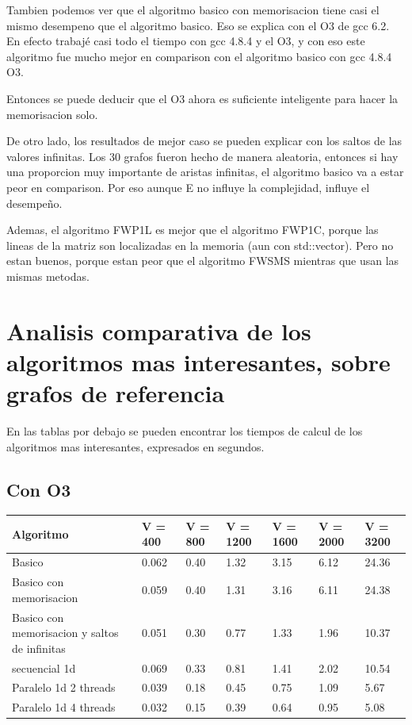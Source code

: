 \documentclass[a4paper,11pt]{article}
\begin{document}
Tambien podemos ver que el algoritmo basico con memorisacion tiene casi el mismo desempeno que el algoritmo basico. Eso se explica con el O3 de gcc 6.2. En efecto trabajé casi todo el tiempo con gcc 4.8.4 y el O3, y con eso este algoritmo fue mucho mejor en comparison con el algoritmo basico con gcc 4.8.4 O3.

Entonces se puede deducir que el O3 ahora es suficiente inteligente para hacer la memorisacion solo.

De otro lado, los resultados de mejor caso se pueden explicar con los saltos de las valores infinitas. Los 30 grafos fueron hecho de manera aleatoria, entonces si hay una proporcion muy importante de aristas infinitas, el algoritmo basico va a estar peor en comparison. Por eso aunque E no influye la complejidad, influye el desempeño.

Ademas,  el algoritmo FWP1L es mejor que el algoritmo FWP1C, porque las lineas de la matriz son localizadas en la memoria (aun con std::vector). Pero no estan buenos, porque estan peor que el algoritmo FWSMS mientras que usan las mismas metodas.

\section{Analisis comparativa de los algoritmos mas interesantes, sobre grafos de referencia}

En las tablas por debajo se pueden encontrar los tiempos de calcul de los algoritmos mas interesantes, expresados en segundos.

\subsection{Con O3}

\begin{center}
  \begin{tabular}{p{3.5cm} | p{1.6cm} | p{1.6cm} | p{1.8cm} | p{1.8cm} | p{1.8cm} | p{1.8cm}}
    \textbf{Algoritmo} &  \textbf{V = 400} &  \textbf{V = 800} &  \textbf{V = 1200} &  \textbf{V = 1600} &  \textbf{V = 2000} &  \textbf{V = 3200} \\
    \hline
    Basico & 0.062 & 0.40 & 1.32 & 3.15 & 6.12 & 24.36 \\
    \hline
    Basico con memorisacion & 0.059 & 0.40 & 1.31 & 3.16 & 6.11 & 24.38 \\
    \hline
    Basico con memorisacion y saltos de infinitas & 0.051 & 0.30 & 0.77 & 1.33 & 1.96 & 10.37 \\
    \hline
    secuencial 1d & 0.069 & 0.33 & 0.81 & 1.41 & 2.02 & 10.54 \\
    \hline
    Paralelo 1d 2 threads & 0.039 & 0.18 & 0.45 & 0.75 & 1.09 & 5.67 \\
    \hline
    Paralelo 1d 4 threads & 0.032 & 0.15 & 0.39 & 0.64 & 0.95 & 5.08 \\
    \hline
  \end{tabular}
\end{center}
\end{document}
